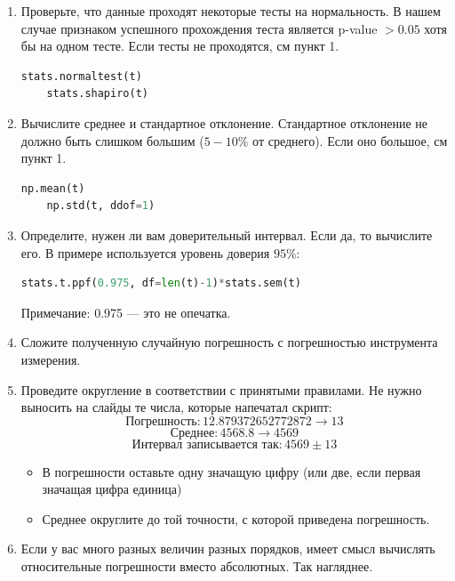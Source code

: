 \documentclass{article}
\begin{document}
\begin {enumerate}
\item Проверьте, что данные проходят некоторые тесты на нормальность. В нашем случае признаком успешного прохождения теста является p-value $> 0.05$ хотя бы на одном тесте. Если тесты не проходятся, см пункт 1.
\begin{lstlisting}[language=Python]
	stats.normaltest(t)
	stats.shapiro(t)
\end{lstlisting}

\item Вычислите среднее и стандартное отклонение. Стандартное отклонение не должно быть слишком большим ($5-10\%$ от среднего). Если оно большое, см пункт 1.
\begin{lstlisting}[language=Python]
	np.mean(t)
	np.std(t, ddof=1)
\end{lstlisting}

\item Определите, нужен ли вам доверительный интервал. Если да, то вычислите его. В примере используется уровень доверия $95\%$:
\begin{lstlisting}[language=Python]
	stats.t.ppf(0.975, df=len(t)-1)*stats.sem(t)
\end{lstlisting}
Примечание: 0.975 --- это не опечатка.

\item Сложите полученную случайную погрешность с погрешностью инструмента измерения.

\item Проведите округление в соответствии с принятыми правилами. Не нужно выносить на слайды те числа, которые напечатал скрипт:
$$ \text{Погрешность}: 12.879372652772872 \rightarrow 13 $$
$$ \text{Среднее}: 4568.8 \rightarrow 4569 $$
$$ \text{Интервал записывается так}: 4569 \pm 13 $$
\begin{itemize}
\item В погрешности оставьте одну значащую цифру (или две, если первая значащая цифра единица)
\item Среднее округлите до той точности, с которой приведена погрешность.
\end{itemize}

\item Если у вас много разных величин разных порядков, имеет смысл вычислять относительные погрешности вместо абсолютных. Так нагляднее.
\end{enumerate}
\end{document}
